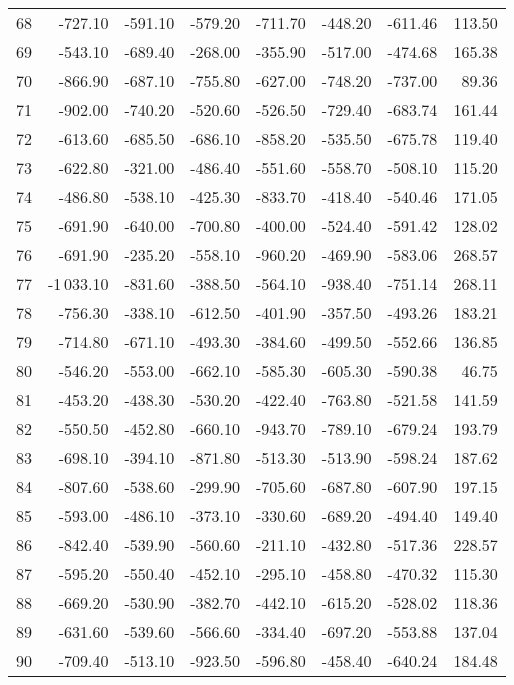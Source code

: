 \begin{longtable}{rrrrrrrr}
68 & -727.10 & -591.10 & -579.20 & -711.70 & -448.20 & -611.46 & 113.50  \\
69 & -543.10 & -689.40 & -268.00 & -355.90 & -517.00 & -474.68 & 165.38  \\
70 & -866.90 & -687.10 & -755.80 & -627.00 & -748.20 & -737.00 & 89.36  \\
71 & -902.00 & -740.20 & -520.60 & -526.50 & -729.40 & -683.74 & 161.44  \\
72 & -613.60 & -685.50 & -686.10 & -858.20 & -535.50 & -675.78 & 119.40  \\
73 & -622.80 & -321.00 & -486.40 & -551.60 & -558.70 & -508.10 & 115.20  \\
74 & -486.80 & -538.10 & -425.30 & -833.70 & -418.40 & -540.46 & 171.05  \\
75 & -691.90 & -640.00 & -700.80 & -400.00 & -524.40 & -591.42 & 128.02  \\
76 & -691.90 & -235.20 & -558.10 & -960.20 & -469.90 & -583.06 & 268.57  \\
77 & -1\,033.10 & -831.60 & -388.50 & -564.10 & -938.40 & -751.14 & 268.11  \\
78 & -756.30 & -338.10 & -612.50 & -401.90 & -357.50 & -493.26 & 183.21  \\
79 & -714.80 & -671.10 & -493.30 & -384.60 & -499.50 & -552.66 & 136.85  \\
80 & -546.20 & -553.00 & -662.10 & -585.30 & -605.30 & -590.38 & 46.75  \\
81 & -453.20 & -438.30 & -530.20 & -422.40 & -763.80 & -521.58 & 141.59  \\
82 & -550.50 & -452.80 & -660.10 & -943.70 & -789.10 & -679.24 & 193.79  \\
83 & -698.10 & -394.10 & -871.80 & -513.30 & -513.90 & -598.24 & 187.62  \\
84 & -807.60 & -538.60 & -299.90 & -705.60 & -687.80 & -607.90 & 197.15  \\
85 & -593.00 & -486.10 & -373.10 & -330.60 & -689.20 & -494.40 & 149.40  \\
86 & -842.40 & -539.90 & -560.60 & -211.10 & -432.80 & -517.36 & 228.57  \\
87 & -595.20 & -550.40 & -452.10 & -295.10 & -458.80 & -470.32 & 115.30  \\
88 & -669.20 & -530.90 & -382.70 & -442.10 & -615.20 & -528.02 & 118.36  \\
89 & -631.60 & -539.60 & -566.60 & -334.40 & -697.20 & -553.88 & 137.04  \\
90 & -709.40 & -513.10 & -923.50 & -596.80 & -458.40 & -640.24 & 184.48  \\

\end{longtable}
